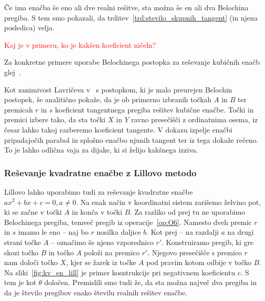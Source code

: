 Če ima enačba še eno ali dve realni rešitve, sta možna še en ali dva Belochina pregiba. S tem smo pokazali, da trditev~\ref{trd:stevilo_skupnih_tangent} (in njena posledica) velja.


\textcolor{red}{Kaj je v primeru, ko je kakšen koeficient ničeln?}

Za konkretne primere uporabe Belochinega postopka za reševanje kubičnih enačb glej~\cite[38--44]{zore2022}.

Kot zanimivost Lavričeva v~\cite[str.\ 10--13]{lavric2013} s postopkom, ki je malo preurejen Belochin postopek, še analitično pokaže, da je ob primerno izbranih točkah $A$ in $B$ ter premicah $r$ in $s$ koeficient tangentnega pregiba rešitev kubične enačbe. Točki in premici izbere tako, da sta točki $X$ in $Y$ ravno presečišči z ordinatnima osema, iz česar lahko takoj razberemo koeficient tangente. V dokazu izpelje enačbi pripadajočih parabol in splošno enačbo njunih tangent ter iz tega dokaže rečeno. To je lahko odlična vaja za dijake, ki si želijo kakšnega izziva.

\subsubsection{Reševanje kvadratne enačbe z Lillovo metodo}
\label{podpodl:kvadr_en_lill}

Lillovo lahko uporabimo tudi za reševanje kvadratne enačbe $a x^2 + b x + c = 0, a \neq 0$. Na enak način v koordinatni sistem zarišemo želvino pot, ki se začne v točki $A$ in konča v točki $B$. Za razliko od prej tu ne uporabimo Belochinega pregiba, temveč pregib iz operacije~\ref{op:O6}. Namesto dveh premic $r$ in $s$ imamo le eno -- naj bo $r$ nosilka daljice $b$. Kot prej -- na razdalji $a$ na drugi strani točke $A$ -- označimo še njeno vzporednico $r'$. Konstruiramo pregib, ki gre skozi točko $B$ in točko $A$ položi na premico $r'$. Njegovo presečišče s premico $r$ nam določi točko $X$, kjer se žarek iz točke $A$ pod pravim kotom odbije v točko $B$. Na sliki~\ref{fig:kv_en_lill} je primer kosntrukcije pri negativnem koeficientu $c$. S tem je kot $\theta$ določen. Premislili smo tudi že, da sta možna največ dva pregiba in da je število pregibov enako številu realnih rešitev enačbe.

